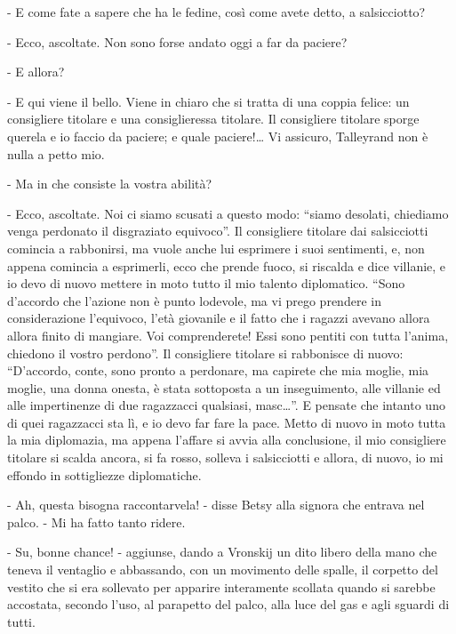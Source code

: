 - E come fate a sapere che ha le fedine, così come avete detto, a salsicciotto? 

- Ecco, ascoltate. Non sono forse andato oggi a far da paciere? 

- E allora? 

- E qui viene il bello. Viene in chiaro che si tratta di una coppia felice: un consigliere titolare e una consiglieressa titolare. Il consigliere titolare sporge querela e io faccio da paciere; e quale paciere!\ldots{} Vi assicuro, Talleyrand non è nulla a petto mio. 

- Ma in che consiste la vostra abilità? 

- Ecco, ascoltate. Noi ci siamo scusati a questo modo: ``siamo desolati, chiediamo venga perdonato il disgraziato equivoco''. Il consigliere titolare dai salsicciotti comincia a rabbonirsi, ma vuole anche lui esprimere i suoi sentimenti, e, non appena comincia a esprimerli, ecco che prende fuoco, si riscalda e dice villanie, e io devo di nuovo mettere in moto tutto il mio talento diplomatico. ``Sono d'accordo che l'azione non è punto lodevole, ma vi prego prendere in considerazione l'equivoco, l'età giovanile e il fatto che i ragazzi avevano allora allora finito di mangiare. Voi comprenderete! Essi sono pentiti con tutta l'anima, chiedono il vostro perdono''. Il consigliere titolare si rabbonisce di nuovo: ``D'accordo, conte, sono pronto a perdonare, ma capirete che mia moglie, mia moglie, una donna onesta, è stata sottoposta a un inseguimento, alle villanie ed alle impertinenze di due ragazzacci qualsiasi, masc\ldots{}''. E pensate che intanto uno di quei ragazzacci sta lì, e io devo far fare la pace. Metto di nuovo in moto tutta la mia diplomazia, ma appena l'affare si avvia alla conclusione, il mio consigliere titolare si scalda ancora, si fa rosso, solleva i salsicciotti e allora, di nuovo, io mi effondo in sottigliezze diplomatiche. 

- Ah, questa bisogna raccontarvela! - disse Betsy alla signora che entrava nel palco. - Mi ha fatto tanto ridere. 

- Su, bonne chance! - aggiunse, dando a Vronskij un dito libero della mano che teneva il ventaglio e abbassando, con un movimento delle spalle, il corpetto del vestito che si era sollevato per apparire interamente scollata quando si sarebbe accostata, secondo l'uso, al parapetto del palco, alla luce del gas e agli sguardi di tutti. 

